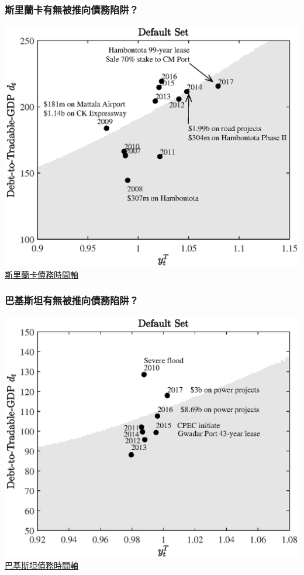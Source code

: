 \documentclass[mathserif]{beamer}
\begin{document}
\begin{frame}
{\begin{columns}
\begin{column}{0.5\textwidth}
            \end{column}
        \end{columns}
        }
    \end{frame}

    \begin{frame}[label = {sri_ds}]
        \frametitle{斯里蘭卡有無被推向債務陷阱？}
        \centering
        \includegraphics[width = 0.8 \textwidth]{fig/default_set_sri_trad_hp_with_china.eps}\\
        \hfill \hyperlink{sri_ts}{\tiny 斯里蘭卡債務時間軸}
    \end{frame}

    \begin{frame}[label = {pak_ds}]
        \frametitle{巴基斯坦有無被推向債務陷阱？}
        \centering
        \includegraphics[width = 0.8 \textwidth]{fig/default_set_pak_trad_hp_with_china.eps}\\
        \hfill \hyperlink{pak_ts}{\tiny 巴基斯坦債務時間軸}
    \end{frame}
\end{document}
